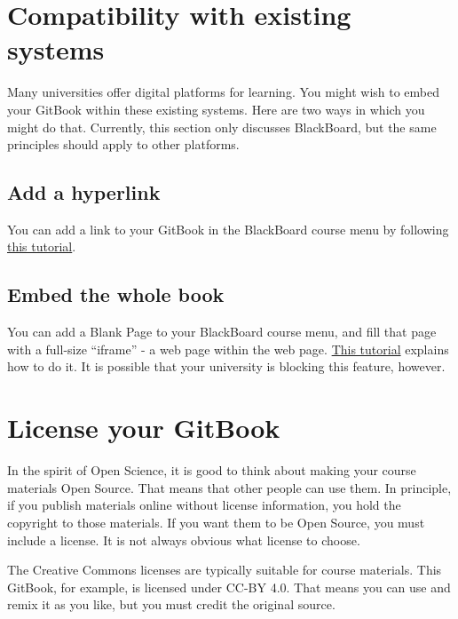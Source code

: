 \documentclass[
]{book}
\begin{document}
\chapter{Compatibility with existing systems}\label{compatibility-with-existing-systems}

Many universities offer digital platforms for learning. You might wish to embed your GitBook within these existing systems. Here are two ways in which you might do that. Currently, this section only discusses BlackBoard, but the same principles should apply to other platforms.

\section{Add a hyperlink}\label{add-a-hyperlink}

You can add a link to your GitBook in the BlackBoard course menu by following \href{https://help.blackboard.com/Learn/Instructor/Course_Content/Create_Content/Create_Course_Materials/Link_to_Websites}{this tutorial}.

\section{Embed the whole book}\label{embed-the-whole-book}

You can add a Blank Page to your BlackBoard course menu, and fill that page with a full-size ``iframe'' - a web page within the web page. \href{https://mycampus.maine.edu/web/uc-faculty-portal/education-technology/-/asset_publisher/vEKuFJYvDY5K/content/inserting-an-iframe-into-blackboard?inheritRedirect=false}{This tutorial} explains how to do it. It is possible that your university is blocking this feature, however.

\chapter{License your GitBook}\label{license-your-gitbook}

In the spirit of Open Science, it is good to think about making your course materials Open Source. That means that other people can use them. In principle, if you publish materials online without license information, you hold the copyright to those materials. If you want them to be Open Source, you must include a license. It is not always obvious what license to choose.

The Creative Commons licenses are typically suitable for course materials. This GitBook, for example, is licensed under CC-BY 4.0. That means you can use and remix it as you like, but you must credit the original source.
\end{document}

